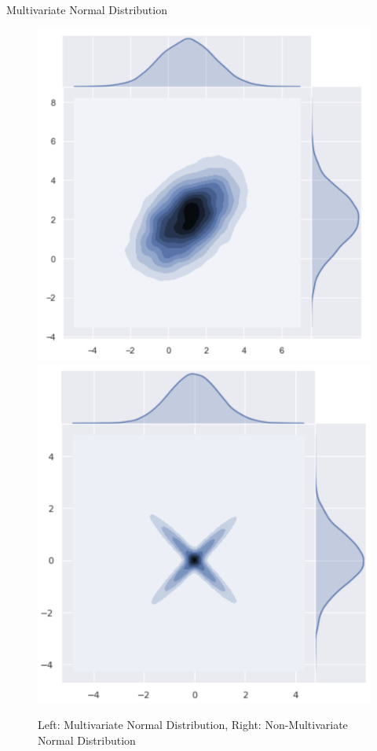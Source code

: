 \documentclass[10pt]{beamer}
\begin{document}
\begin{frame}{Multivariate Normal Distribution}
\begin{center}
\begin{figure}
\includegraphics[scale=0.15]{images/multinormal_density.png} 
\includegraphics[scale=0.15]{images/no_multinormal_density.png} 
\caption{Left: Multivariate Normal Distribution, Right: Non-Multivariate Normal Distribution}
\end{figure}
\end{center}
\end{frame}
\end{document}
